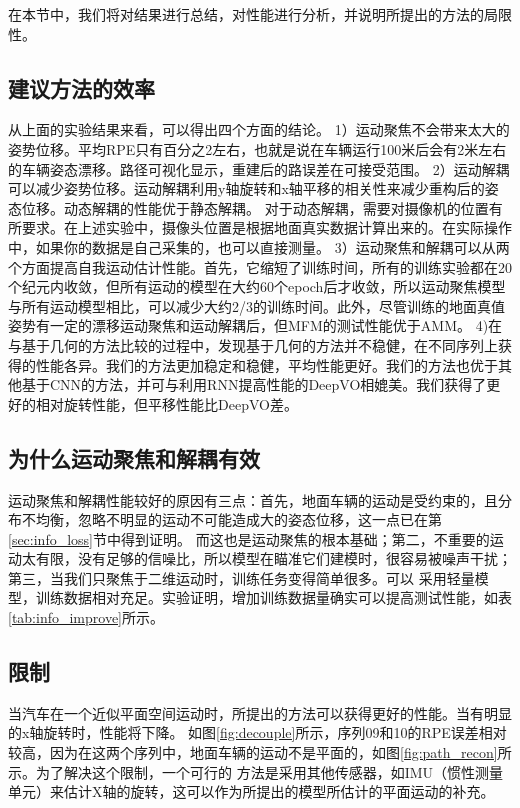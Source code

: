 在本节中，我们将对结果进行总结，对性能进行分析，并说明所提出的方法的局限性。
\subsection{建议方法的效率}

从上面的实验结果来看，可以得出四个方面的结论。
1）运动聚焦不会带来太大的姿势位移。平均RPE只有百分之2左右，也就是说在车辆运行100米后会有2米左右的车辆姿态漂移。路径可视化显示，重建后的路误差在可接受范围。
2）运动解耦可以减少姿势位移。运动解耦利用y轴旋转和x轴平移的相关性来减少重构后的姿态位移。动态解耦的性能优于静态解耦。
对于动态解耦，需要对摄像机的位置有所要求。在上述实验中，摄像头位置是根据地面真实数据计算出来的。在实际操作中，如果你的数据是自己采集的，也可以直接测量。
3）运动聚焦{和解耦}可以从两个方面提高自我运动估计性能。首先，它缩短了训练时间，所有的训练实验都在20个纪元内收敛，但所有运动的模型在大约60个epoch后才收敛，所以运动聚焦模型与所有运动模型相比，可以减少大约2/3的训练时间。此外，尽管训练的地面真值姿势有一定的漂移{运动聚焦和运动解耦后}，但{MFM}的测试性能优于{AMM}。
4)在与基于几何的方法比较的过程中，发现基于几何的方法并不稳健，在不同序列上获得的性能各异。我们的方法更加稳定和稳健，平均性能更好。我们的方法也优于其他基于CNN的方法，并可与利用RNN提高性能的DeepVO\cite{wang2017deepvo}相媲美。我们获得了更好的相对旋转性能，但平移性能比DeepVO差。


\subsection{为什么运动聚焦和解耦有效}

运动聚焦{和解耦}性能较好的原因有三点：首先，地面车辆的运动是受约束的，且分布不均衡，忽略不明显的运动不可能造成大的姿态位移，这一点已在第\ref{sec:info_loss}节中得到证明。
而这也是运动聚焦的根本基础；第二，不重要的运动太有限，没有足够的信噪比，所以模型在瞄准它们建模时，很容易被噪声干扰；第三，当我们只聚焦于二维运动时，训练任务变得{简单很多}。可以
采用轻量模型，训练数据相对充足。实验证明，增加训练数据量确实可以提高测试性能，如表\ref{tab:info_improve}所示。

\subsection{限制}

当汽车在一个近似平面空间运动时，所提出的方法可以获得更好的性能。当有明显的x轴旋转时，性能将下降。
如图\ref{fig:decouple}所示，序列09和10的RPE误差相对较高，因为在{这}两个序列中，地面车辆的运动不是{平面}的，如图\ref{fig:path_recon}所示。为了解决这个限制，一个可行的
方法是采用其他传感器，如IMU（惯性测量单元）来估计X轴的旋转，这可以作为所提出的模型所估计的平面运动的补充。

